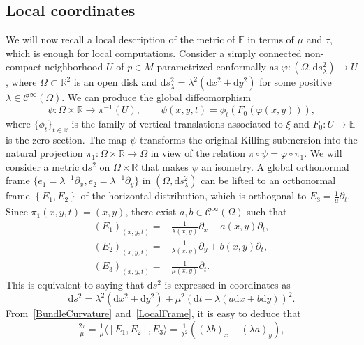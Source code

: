 \documentclass[a4paper,10pt,reqno]{amsart}
\newcommand{\R}{\mathbb{R}}
\newcommand{\df}{\mathrm{d}}
\newcommand{\E}{\mathbb{E}}
\theoremstyle{definition}
\theoremstyle{remark}
\numberwithin{equation}{section}
\begin{document}
		
\subsection{Local coordinates}
We will now recall a local description of the metric of $\E$ in terms of $\mu$ and $\tau$, which is enough for local computations. Consider a simply connected non-compact neighborhood $U$ of $p\in M$ parametrized conformally as $\varphi\colon\left(\Omega,\df s^2_\lambda\right)\to U$, where $\Omega\subset\R^2$ is an open disk and $\df s^2_\lambda=\lambda^2(\df x^2+\df y^2)$ for some positive $\lambda\in\mathcal C^\infty(\Omega)$. We can produce the global diffeomorphism
\[
	\psi\colon\Omega\times\R\longrightarrow\pi^{-1}(U),\qquad \psi(x,y,t)=\phi_t(F_0(\varphi(x,y))),
\]
where $\{\phi_t\}_{t\in\R}$ is the family of vertical translations associated to $\xi$ and $F_0\colon U\to \E$ is the zero section. The map $\psi$ transforms the original Killing submersion into the natural projection $\pi_1\colon\Omega\times\R\to\Omega$ in view of the relation $\pi\circ\psi=\varphi\circ\pi_1$. We will consider a metric $\df s^2$ on $\Omega\times\R$ that makes $\psi$ an isometry. A global orthonormal frame $\{e_1=\lambda^{-1}\partial_x,e_2=\lambda^{-1}\partial_y\}$ in $(\Omega,\df s^2_\lambda)$ can be lifted to an orthonormal frame $\left\{E_1,E_2\right\}$ of the horizontal distribution, which is orthogonal to $E_3=\frac{1}{\mu}\partial_t$. Since $\pi_1(x,y,t)=(x,y)$, there exist $a,b\in\mathcal{C}^\infty(\Omega)$ such that
\begin{equation}\label{LocalFrame}
	\begin{aligned}
		(E_1)_{(x,y,t)}=&\tfrac{1}{\lambda(x,y)}\partial_x+a(x,y)\partial_t,\\
		(E_2)_{(x,y,t)}=&\tfrac{1}{\lambda(x,y)}\partial_y+b(x,y)\partial_t,\\
		(E_3)_{(x,y,t)}=&\tfrac{1}{\mu(x,y)}\partial_t.
	\end{aligned}
\end{equation} 
This is equivalent to saying that $\df s^2$ is expressed in coordinates as
\begin{equation}\label{MetricInCoordinates}
	\df s^2=\lambda^2(\df x^2+\df y^2)+\mu^2(\df t-\lambda(a\df x+b\df y))^2.
\end{equation}
From~\eqref{BundleCurvature} and~\eqref{LocalFrame}, it is easy to deduce that
\begin{equation}\label{eqn:taumu}
\tfrac{2\tau}{\mu}=\tfrac{1}{\mu}\langle\left[E_1,E_2\right],E_3\rangle=\tfrac{1}{\lambda^2}\left((\lambda b)_x-(\lambda a)_y\right),
\end{equation}
\end{document}
